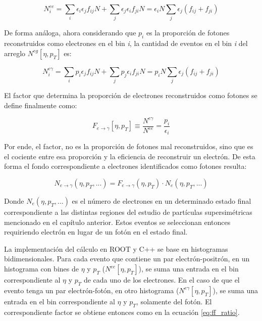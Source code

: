 \begin{equation}
N_{i}^{ee} = \sum_{i}\epsilon_{i}\epsilon_{j}f_{ij}N + \sum_{j}\epsilon_{j}\epsilon_{i}f_{ji}N = \epsilon_{i}N\sum_{j}\epsilon_{j}(f_{ij}+f_{ji})
\end{equation}

De forma análoga, ahora considerando que $p_{i}$ es la proporción de fotones reconstruidos como electrones en el bin \textit{i}, la cantidad de eventos en el bin \textit{i} del arreglo $N^{eg}[\eta , p_{T}]$ es:

\begin{equation}
N_{i}^{e\gamma} = \sum_{i}p_{i}\epsilon_{j}f_{ij}N + \sum_{j}p_{j}\epsilon_{i}f_{ji}N = p_{i}N\sum_{j}\epsilon_{j}(f_{ij}+f_{ji})
\end{equation}

El factor que determina la proporción de electrones reconstruidos como fotones se define finalmente como:

\begin{equation}
F_{e\rightarrow\gamma}[\eta , p_{T}]\equiv\frac{N^{e\gamma}}{N^{ee}}=\frac{p_{i}}{\epsilon_{i}}
\end{equation}

Por ende, el factor, no es la proporción de fotones mal reconstruidos, sino que es el cociente entre esa proporción y la eficiencia de reconstruir un electrón. De esta forma el fondo correspondiente a electrones identificados como fotones resulta:

\begin{equation}
N_{e\rightarrow\gamma}(\eta , p_{T} , ... ) = F_{e\rightarrow\gamma}(\eta , p_{T})\cdot N_{e}(\eta , p_{T} , ...)
\end{equation}
	
Donde $N_{e}(\eta , p_{T} , ...)$ es el número de electrones en un determinado estado final correspondiente a las distintas regiones del estudio de partículas supersimétricas mencionado en el capítulo anterior. Estos eventos se seleccionan entonces requiriendo electrón en lugar de un fotón en el estado final. 

La implementación del cálculo en ROOT y C++ se  base en histogramas bidimensionales. Para cada evento que contiene un par electrón-positrón, en un histograma con bines de $\eta$ y $p_{T}$ ($N^{ee}[\eta , p_{T}]$), se suma una entrada en el bin correspondiente al $\eta$ y $p_{T}$ de cada uno de los electrones. En el caso de que el evento tenga un par electrón-fotón, en otro histograma ($N^{e\gamma}[\eta , p_{T}]$), se suma una entrada en el bin correspondiente al $\eta$ y $p_{T}$, solamente del fotón. El correspondiente factor se obtiene entonces como en la ecuación \ref{eq:ff_ratio}.

